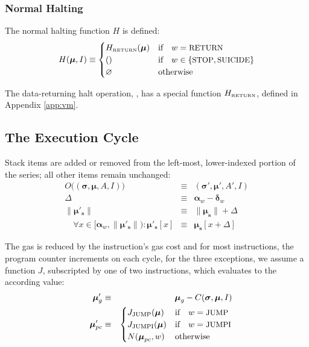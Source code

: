 \documentclass[9pt,oneside]{amsart}
\begin{document}
\begin{multicols}{2}
\subsubsection{Normal Halting}

The normal halting function $H$ is defined:
\begin{equation}
H(\boldsymbol{\mu}, I) \equiv \begin{cases}
H_{\text{\tiny RETURN}}(\boldsymbol{\mu}) & \text{if} \quad w = \text{\small RETURN} \\
() & \text{if} \quad w \in \{ \text{\small STOP}, \text{\small SUICIDE} \} \\
\varnothing & \text{otherwise}
\end{cases}
\end{equation}

The data-returning halt operation, , has a special function $H_{\text{\tiny RETURN}}$, defined in Appendix \ref{app:vm}.

\subsection{The Execution Cycle}

Stack items are added or removed from the left-most, lower-indexed portion of the series; all other items remain unchanged:
\begin{eqnarray}
O\big((\boldsymbol{\sigma}, \boldsymbol{\mu}, A, I)\big) & \equiv & (\boldsymbol{\sigma}', \boldsymbol{\mu}', A', I) \\
\Delta & \equiv & \mathbf{\alpha}_w - \mathbf{\delta}_w \\
\lVert\boldsymbol{\mu}'_\mathbf{s}\rVert & \equiv & \lVert\boldsymbol{\mu}_\mathbf{s}\rVert + \Delta \\
\quad \forall x \in [\mathbf{\alpha}_w, \lVert\boldsymbol{\mu}'_\mathbf{s}\rVert): \boldsymbol{\mu}'_\mathbf{s}[x] & \equiv & \boldsymbol{\mu}_\mathbf{s}[x+\Delta]
\end{eqnarray}

The gas is reduced by the instruction's gas cost and for most instructions, the program counter increments on each cycle, for the three exceptions, we assume a function $J$, subscripted by one of two instructions, which evaluates to the according value:
\begin{eqnarray}
\quad \boldsymbol{\mu}'_{g} & \equiv & \boldsymbol{\mu}_{g} - C(\boldsymbol{\sigma}, \boldsymbol{\mu}, I) \\
\quad \boldsymbol{\mu}'_{pc} & \equiv & \begin{cases}
J_{\text{JUMP}}(\boldsymbol{\mu}) & \text{if} \quad w = \text{\small JUMP} \\
J_{\text{JUMPI}}(\boldsymbol{\mu}) & \text{if} \quad w = \text{\small JUMPI} \\
N(\boldsymbol{\mu}_{pc}, w) & \text{otherwise}
\end{cases}
\end{eqnarray}


\end{multicols}
\end{document}

